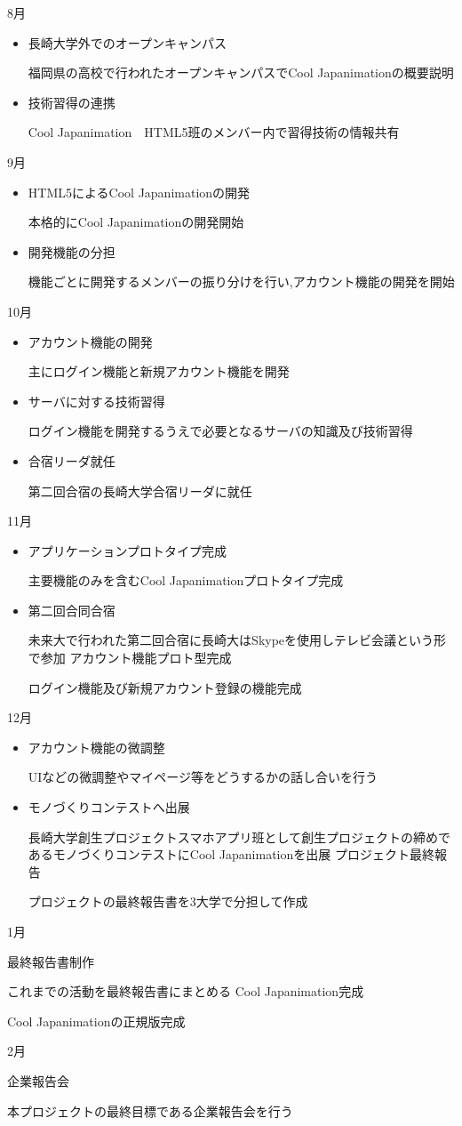 8月
\begin{itemize}
\item 長崎大学外でのオープンキャンパス
\par 福岡県の高校で行われたオープンキャンパスでCool Japanimationの概要説明
\item 技術習得の連携
\par Cool Japanimation　HTML5班のメンバー内で習得技術の情報共有
\end{itemize}
9月
\begin{itemize}
\item HTML5によるCool Japanimationの開発
\par 本格的にCool Japanimationの開発開始
\item 開発機能の分担
\par 機能ごとに開発するメンバーの振り分けを行い,アカウント機能の開発を開始
\end{itemize}
10月
\begin{itemize}
\item アカウント機能の開発
\par 主にログイン機能と新規アカウント機能を開発
\item サーバに対する技術習得
\par ログイン機能を開発するうえで必要となるサーバの知識及び技術習得
\item 合宿リーダ就任
\par 第二回合宿の長崎大学合宿リーダに就任
\end{itemize}
11月
\begin{itemize}
\item アプリケーションプロトタイプ完成
\par 主要機能のみを含むCool Japanimationプロトタイプ完成
\item 第二回合同合宿
\par 未来大で行われた第二回合宿に長崎大はSkypeを使用しテレビ会議という形で参加
\items アカウント機能プロト型完成
\par ログイン機能及び新規アカウント登録の機能完成
\end{itemize}
12月
\begin{itemize}
\item アカウント機能の微調整
\par UIなどの微調整やマイページ等をどうするかの話し合いを行う
\item モノづくりコンテストへ出展
\par 長崎大学創生プロジェクトスマホアプリ班として創生プロジェクトの締めであるモノづくりコンテストにCool Japanimationを出展
\items プロジェクト最終報告
\par プロジェクトの最終報告書を3大学で分担して作成
\end{itemize}
1月
\begin{itemize}
\items 最終報告書制作
\par これまでの活動を最終報告書にまとめる
\items Cool Japanimation完成
\par Cool Japanimationの正規版完成
\end{itemize}
2月
\begin{itemize}
\items 企業報告会
\par 本プロジェクトの最終目標である企業報告会を行う
\end{itemize}
